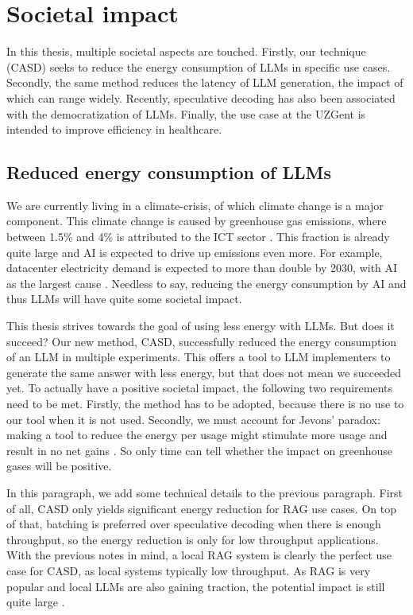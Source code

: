 
\chapter{Societal impact}
\label{sec:societal_impact}

In this thesis, multiple societal aspects are touched. Firstly, our technique (CASD) seeks to reduce the energy consumption of LLMs in specific use cases. Secondly, the same method reduces the latency of LLM generation, the impact of which can range widely. Recently, speculative decoding has also been associated with the democratization of LLMs. Finally, the use case at the UZGent is intended to improve efficiency in healthcare.

\section{Reduced energy consumption of LLMs}
We are currently living in a climate-crisis, of which climate change is a major component. This climate change is caused by greenhouse gas emissions, where between 1.5\% and 4\% is attributed to the ICT sector \cite{ayers2025measuring}. This fraction is already quite large and AI is expected to drive  up emissions even more. For example, datacenter electricity demand is expected to more than double by 2030, with AI as the largest cause \cite{iea2025ai}. Needless to say, reducing the energy consumption by AI and thus LLMs will have quite some societal impact. %

This thesis strives towards the goal of using less energy with LLMs. But does it succeed? Our new method, CASD, successfully reduced the energy consumption of an LLM in multiple experiments. This offers a tool to LLM implementers to generate the same answer with less energy, but that does not mean we succeeded yet. To actually have a positive societal impact, the following two requirements need to be met. Firstly, the method has to be adopted, because there is no use to our tool when it is not used. Secondly, we must account for Jevons' paradox: making a tool to reduce the energy per usage might stimulate more usage and result in no net gains \cite{alcott2005jevons}. So only time can tell whether the impact on greenhouse gases will be positive.

In this paragraph, we add some technical details to the previous paragraph. First of all, CASD only yields significant energy reduction for RAG use cases. On top of that, batching is preferred over speculative decoding when there is enough throughput, so the energy reduction is only for low throughput applications. With the previous notes in mind, a local RAG system is clearly the perfect use case for CASD, as local systems typically low throughput. As RAG is very popular and local LLMs are also gaining traction, the potential impact is still quite large \cite{espin2025rise, k2view2025GenAI, pieces2025local, menlov2025state}. 

